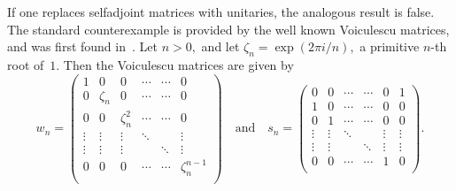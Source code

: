 \documentclass[10pt]{amsart}
\theoremstyle{definition}
\newcommand{\zt}{\zeta}
\newcommand{\andeqn}{\,\,\,\,\,\, {\mbox{and}} \,\,\,\,\,\,}
\begin{document}
If one replaces selfadjoint matrices with unitaries, the analogous
result is false.
The standard counterexample is provided by the well known
Voiculescu matrices, and was first found in~\cite{Vc}.
Let $n > 0,$ and let $\zt_n = \exp (2 \pi i / n),$ a primitive
$n$-th root of~$1.$
Then the Voiculescu matrices are given by
\[
w_n = \left( \begin{array}{cccccc}
     1 & 0 & 0 & \cdots & \cdots &  0 \\
     0 & \zt_n & 0 & \cdots & \cdots &  0 \\
     0 & 0 & \zt_n^2 & \cdots & \cdots &  0 \\
     \vdots & \vdots & \vdots & \ddots &        &  \vdots \\
     \vdots & \vdots & \vdots &        & \ddots & \vdots \\
      0 & 0 & 0 & \cdots & \cdots &  \zt_n^{n - 1} \\
   \end{array} \right)
\andeqn
s_n = \left( \begin{array}{cccccc}
     0 & 0 &  \cdots & \cdots & 0 & 1 \\
     1 & 0 &  \cdots & \cdots & 0 & 0 \\
     0 & 1 &  \cdots & \cdots & 0 & 0 \\
     \vdots &  \vdots & \ddots &        & \vdots & \vdots \\
     \vdots &  \vdots &            & \ddots & \vdots & \vdots \\
     0 & 0 &  \cdots & \cdots & 1 & 0 \\
   \end{array} \right).
\]
\end{document}
